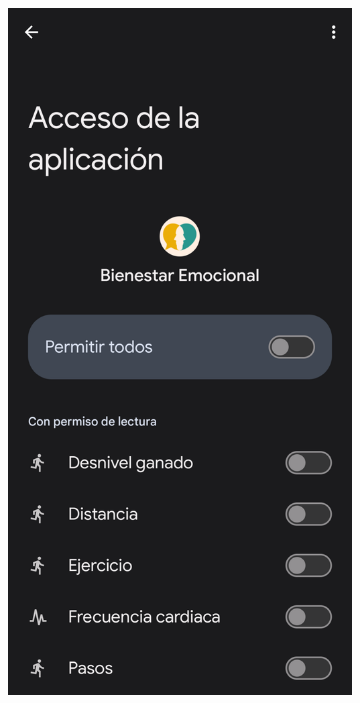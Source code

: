             \begin{figure}[htbp]
                \centering
                \begin{subfigure}[c]{0.32\textwidth}
                    \centering
                    \includegraphics[width=1\textwidth]{figures/pruebas/primer_uso/Permisos HC.png}

\end{subfigure}
\end{figure}
